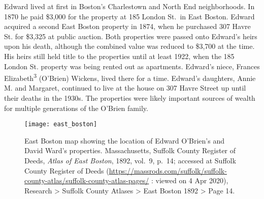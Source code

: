 Edward lived at first in Boston's Charlestown\cite{MaryAnn3OBrienBirth} and North End\cite{Edward3OBrienBirth} neighborhoods. In 1870 he paid \$3,000 for the property at 185 London St.\ in East Boston.\cite{LondonStDeed,LondonStMap} Edward acquired a second East Boston property in 1874, when he purchased 307 Havre St. for \$3,325 at public auction.\cite{HavrePurchase,HavreMap} Both properties were passed onto Edward's heirs upon his death, although the combined value was reduced to \$3,700 at the time.\cite{Edward2OBrienProbate} His heirs still held title to the properties until at least 1922,\cite{Bromley1922} when the 185 London St. property was being rented out as apartments.\cite{GlobeRobbery} Edward's niece, Frances Elizabeth\textsuperscript{3} (O'Brien) Wickens, lived there for a time.\cite{Frances3OBrien1914} Edward's daughters, Annie M. and Margaret, continued to live at the house on 307 Havre Street up until their deaths in the 1930s.\cite{AnnMaria3OBrienDeath,Margaret3OBrienDeath} The properties were likely important sources of wealth for multiple generations of the O'Brien family.

\begin{figure}
	\centering
	\texttt{[image: east\_boston]}
	\caption{East Boston map showing the location of Edward O'Brien's and David Ward's properties. Massachusetts, Suffolk County Register of Deeds, \textit{Atlas of East Boston}, 1892, vol.\ 9, p.\ 14; accessed at Suffolk County Register of Deeds (\url{https://massrods.com/suffolk/suffolk-county-atlas/suffolk-county-atlas-pages/} : viewed on 4 Apr 2020), Research > Suffolk County Atlases > East Boston 1892 > Page 14.}
\end{figure}

